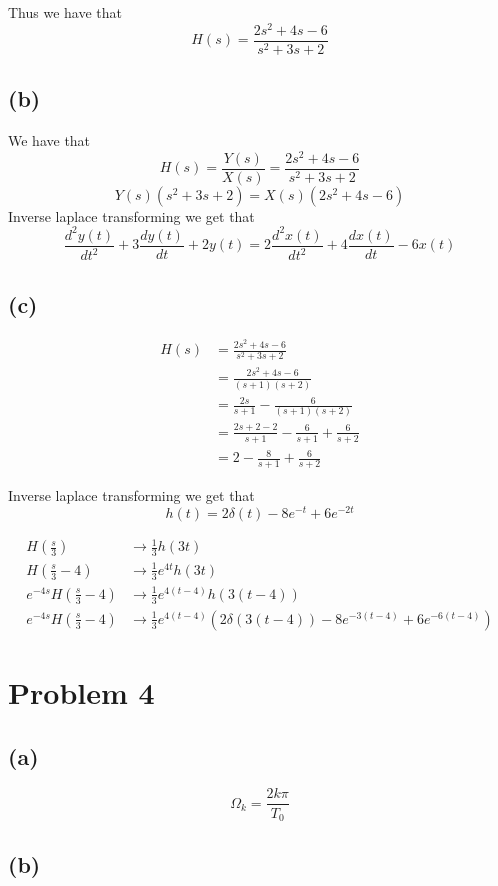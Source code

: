 \documentclass[12pt]{article}
\begin{document}
Thus we have that
$$H(s)=\boxed{\frac{2s^2+4s-6}{s^2+3s+2}}$$
\subsection*{(b)}
We have that
$$H(s)=\frac{Y(s)}{X(s)}=\frac{2s^2+4s-6}{s^2+3s+2}$$
$$Y(s)(s^2+3s+2)=X(s)(2s^2+4s-6)$$
Inverse laplace transforming we get that
$$\boxed{\frac{d^2y(t)}{dt^2}+3\frac{dy(t)}{dt}+2y(t)=2\frac{d^2x(t)}{dt^2}+4\frac{dx(t)}{dt}-6x(t)}$$
\subsection*{(c)}
\begin{align*}
H(s)&=\frac{2s^2+4s-6}{s^2+3s+2}\\
&=\frac{2s^2+4s-6}{(s+1)(s+2)}\\
&=\frac{2s}{s+1}-\frac{6}{(s+1)(s+2)}\\
&=\frac{2s+2-2}{s+1}-\frac{6}{s+1}+\frac{6}{s+2}\\
&=2-\frac{8}{s+1}+\frac{6}{s+2}
\end{align*}

Inverse laplace transforming we get that
$$h(t)=2\delta(t)-8e^{-t}+6e^{-2t}$$

\begin{align*}
H(\frac{s}{3})&\to \frac{1}{3}h(3t)\\
H(\frac{s}{3}-4)&\to\frac{1}{3}e^{4t}h(3t)\\
e^{-4s}H(\frac{s}{3}-4)&\to\frac{1}{3}e^{4(t-4)}h(3(t-4))\\
e^{-4s}H(\frac{s}{3}-4)&\to\boxed{\frac{1}{3}e^{4(t-4)}\left(2\delta(3(t-4))-8e^{-3(t-4)}+6e^{-6(t-4)}\right)}
\end{align*}
\section*{Problem 4}
\subsection*{(a)}
$$\Omega_k=\boxed{\frac{2k\pi}{T_0}}$$
\subsection*{(b)}
\end{document}
